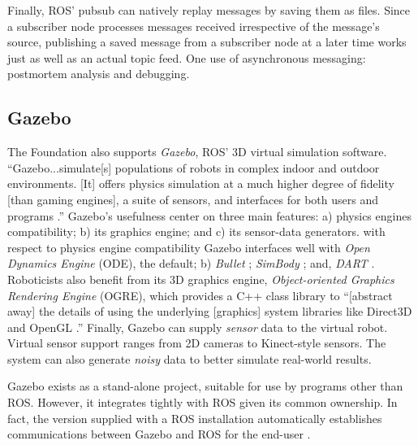 \documentclass[9pt,twocolumn,twoside]{../../styles/osajnl}
\begin{document}
Finally, ROS' pubsub can natively replay messages by saving them as files.  Since a subscriber node processes messages received irrespective of the message's source, publishing a saved message from a subscriber node at a later time works just as well as an actual topic feed.  One use of asynchronous messaging: postmortem analysis and debugging.

\subsection{Gazebo} 
The Foundation also supports \textit{Gazebo}, ROS' 3D virtual simulation software.  ``Gazebo...simulate[s] populations of robots in complex indoor and outdoor environments. [It] offers physics simulation at a much higher degree of fidelity [than gaming engines], a suite of sensors, and interfaces for both users and programs \cite{www-gazebo-overview}.''  Gazebo's usefulness center on three main features: a) physics engines compatibility; b) its graphics engine; and c) its sensor-data generators.  with respect to physics engine compatibility Gazebo interfaces well with \textit{Open Dynamics Engine} \cite{www-ode-homepage} (ODE), the default; b) \textit{Bullet} \cite{www-bullet-homepage}; \textit{SimBody} \cite{www-simbody-homepage}; and, \textit{DART} \cite{www-dart-homepage}. Roboticists also benefit from its 3D graphics engine, \textit{Object-oriented Graphics Rendering Engine} \cite{www-ogre-homepage} (OGRE), which provides a C++ class library to ``[abstract away] the details of using the underlying [graphics] system libraries like Direct3D and OpenGL \cite{www-ogre-about}.''  Finally, Gazebo can supply \textit{sensor} data to the virtual robot.  Virtual sensor support ranges from 2D cameras to Kinect-style sensors.  The system can also generate \textit{noisy} data to better simulate real-world results.

Gazebo exists as a stand-alone project, suitable for use by programs other than ROS.  However, it integrates tightly with ROS given its common ownership.  In fact, the version supplied with a ROS installation automatically establishes communications between Gazebo and ROS for the end-user \cite{www-gazebo-ros}.
\end{document}
